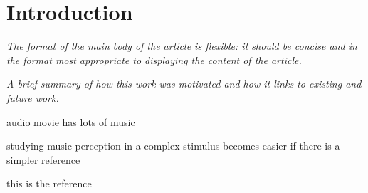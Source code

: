 \section*{Introduction} 
\textit{The format of the main body of the article is flexible: it should be concise and in the format most appropriate to displaying the content of the article.}

\textit{A brief summary of how this work was motivated and how it links to existing and future work.}

audio movie has lots of music

studying music perception in a complex stimulus becomes easier if there is a simpler reference

this is the reference